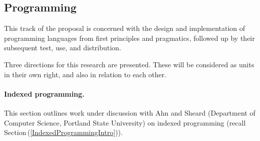 \documentclass[11pt,twocolumn]{article}
\newcommand{\pref}[1]{\,(\ref{#1})}
\begin{document}
\subsection{Programming}
\label{Programming}

This track of the proposal is concerned with the design and implementation
of programming languages from first principles and pragmatics, followed up
by their subsequent test, use, and distribution.

Three directions for this research are presented.  These will be
considered as units in their own right, and also in relation to each other.

\setcounter{paragraph}{0}
\paragraph{Indexed programming.}
\label{IndexedProgrammingParagraph}

This section outlines work under discussion with Ahn and Sheard
(Department of Computer Science, Portland State University) on indexed
programming (recall Section\pref{IndexedProgrammingIntro}).
\end{document}
